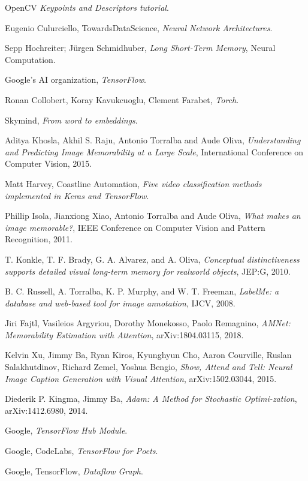 \begin{thebibliography}{}
	OpenCV
	\emph{Keypoints and Descriptors tutorial}.


	Eugenio Culurciello, TowardsDataScience,
	\emph{Neural Network Architectures}.

	Sepp Hochreiter; Jürgen Schmidhuber,
	\emph{Long Short-Term Memory},
	Neural Computation.

	Google’s AI organization,
	\emph{TensorFlow}.


	Ronan Collobert, Koray Kavukcuoglu, Clement Farabet,
    \emph{Torch}.

	Skymind,
    \emph{From word to embeddings}.

	Aditya Khosla, Akhil S. Raju, Antonio Torralba and Aude Oliva,
	\emph{Understanding and Predicting Image Memorability at a Large Scale},
	International Conference on Computer Vision,
	2015.

	Matt Harvey, Coastline Automation,
	\emph{Five video classification methods implemented in Keras and TensorFlow}.

	Phillip Isola, Jianxiong Xiao, Antonio Torralba and Aude Oliva,
	\emph{What makes an image memorable?},
	IEEE Conference on Computer Vision and Pattern Recognition,
	2011.

	T. Konkle, T. F. Brady, G. A. Alvarez, and A. Oliva,
	\emph{Conceptual distinctiveness supports detailed visual long-term memory for realworld objects},
	JEP:G, 2010.

	B. C. Russell, A. Torralba, K. P. Murphy, and W. T. Freeman,
	\emph{LabelMe: a database and web-based tool for image annotation},
	IJCV, 2008.

	Jiri Fajtl, Vasileios Argyriou, Dorothy Monekosso, Paolo Remagnino,
	\emph{AMNet: Memorability Estimation with Attention},
	arXiv:1804.03115, 2018.

	Kelvin Xu, Jimmy Ba, Ryan Kiros, Kyunghyun Cho, Aaron Courville, Ruslan Salakhutdinov, Richard Zemel, Yoshua Bengio,
	\emph{Show, Attend and Tell: Neural Image Caption Generation with Visual Attention},
	arXiv:1502.03044, 2015.

	Diederik P. Kingma, Jimmy Ba,
	\emph{Adam: A Method for Stochastic Optimi-zation},
	arXiv:1412.6980, 2014.

	Google,
	\emph{TensorFlow Hub Module}.

	Google, CodeLabs,
	\emph{TensorFlow for Poets}.

	Google, TensorFlow,
	\emph{Dataflow Graph}.

\end{thebibliography}